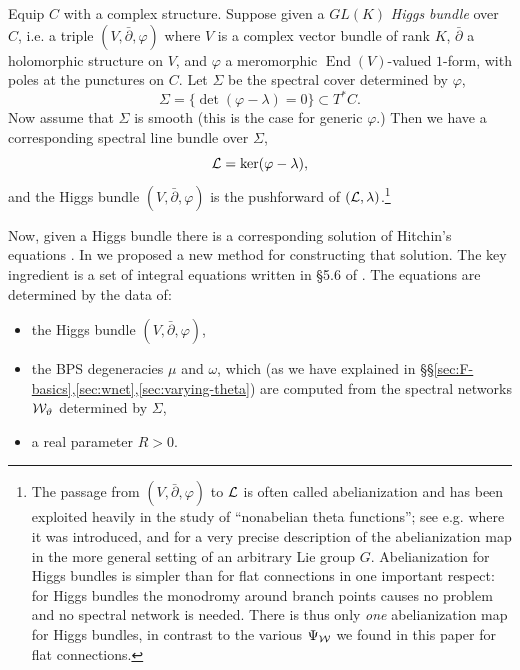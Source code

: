\documentclass[11pt,a4paper]{article}
\def\CL {{\cal L}}
\def\wnet {{\cal W}}
\newcommand{\ti}[1]{\textit{#1}}
\def\CL {{\cal L}}
\def\wnet {{\cal W}}
\DeclareMathOperator{\End}{{End}}
\begin{document}
Equip $C$ with a complex structure.
Suppose given a $GL(K)$ \ti{Higgs bundle} over $C$, i.e. a triple $(V, \bar\partial, \varphi)$
where $V$ is a complex vector bundle
of rank $K$, $\bar\partial$ a holomorphic structure on $V$,
and $\varphi$ a meromorphic $\End(V)$-valued $1$-form, with poles at the
punctures on $C$.
Let $\Sigma$ be the spectral cover
determined by $\varphi$,
\begin{equation}
\Sigma = \{ \det(\varphi - \lambda) = 0 \} \subset T^* C.
\end{equation}
Now assume that $\Sigma$ is smooth (this is the case for generic $\varphi$.)  Then
we have a corresponding spectral line bundle over $\Sigma$,
\begin{equation}
 \CL = \ker (\varphi - \lambda),
\end{equation}
and the Higgs bundle $(V,\bar\partial,\varphi)$ is the pushforward of $(\CL, \lambda)$.\footnote{The passage from $(V,\bar\partial,\varphi)$ to $\CL$ is
often called abelianization and has been exploited heavily in the study of ``nonabelian theta functions''; see e.g. \cite{MR92b:57008}
where it was introduced, and \cite{dongaits} for a very precise description of the abelianization map
in the more general setting of an arbitrary Lie group $G$.
Abelianization for Higgs bundles is simpler than for flat connections in one important respect:  for
Higgs bundles the monodromy around branch points causes no problem and no spectral network is needed.  There is thus
only \ti{one} abelianization map for Higgs bundles, in contrast to the various $\Psi_\wnet$ we found
in this paper for flat connections.}

Now, given a Higgs bundle there is a corresponding solution of Hitchin's equations \cite{MR89a:32021,MR965220,MR887285,hbnc,wnh}.
In \cite{Gaiotto:2011tf} we proposed a new method for constructing that solution.
The key ingredient is a set of integral equations written in \S 5.6 of \cite{Gaiotto:2011tf}.
The equations are determined by the data of:
\begin{itemize}
 \item the Higgs bundle $(V,\bar\partial,\varphi)$,
 \item the BPS degeneracies $\mu$ and $\omega$, which (as we have explained in \S\S \ref{sec:F-basics},\ref{sec:wnet},\ref{sec:varying-theta}) are computed from the spectral networks $\wnet_\vartheta$ determined by $\Sigma$,
 \item a real parameter $R>0$.
\end{itemize}
\end{document}
